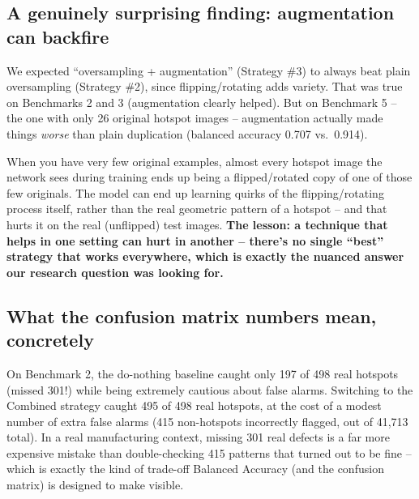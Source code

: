 \documentclass[11pt]{article}
\begin{document}
\subsection{A genuinely surprising finding: augmentation can backfire}
We expected ``oversampling + augmentation'' (Strategy \#3) to always
beat plain oversampling (Strategy \#2), since flipping/rotating adds
variety. That was true on Benchmarks 2 and 3 (augmentation clearly
helped). But on Benchmark 5 -- the one with only 26 original hotspot
images -- augmentation actually made things \emph{worse} than plain
duplication (balanced accuracy 0.707 vs.\ 0.914).

\begin{takeaway}
When you have very few original examples, almost every hotspot image
the network sees during training ends up being a flipped/rotated copy
of one of those few originals. The model can end up learning quirks
of the flipping/rotating process itself, rather than the real
geometric pattern of a hotspot -- and that hurts it on the real
(unflipped) test images. \textbf{The lesson: a technique that helps in
one setting can hurt in another -- there's no single ``best''
strategy that works everywhere, which is exactly the nuanced answer
our research question was looking for.}
\end{takeaway}

\subsection{What the confusion matrix numbers mean, concretely}
On Benchmark 2, the do-nothing baseline caught only 197 of 498 real
hotspots (missed 301!) while being extremely cautious about false
alarms. Switching to the Combined strategy caught 495 of 498 real
hotspots, at the cost of a modest number of extra false alarms (415
non-hotspots incorrectly flagged, out of 41,713 total). In a
real manufacturing context, missing 301 real defects is a far more
expensive mistake than double-checking 415 patterns that turned out
to be fine -- which is exactly the kind of trade-off Balanced Accuracy
(and the confusion matrix) is designed to make visible.
\end{document}
